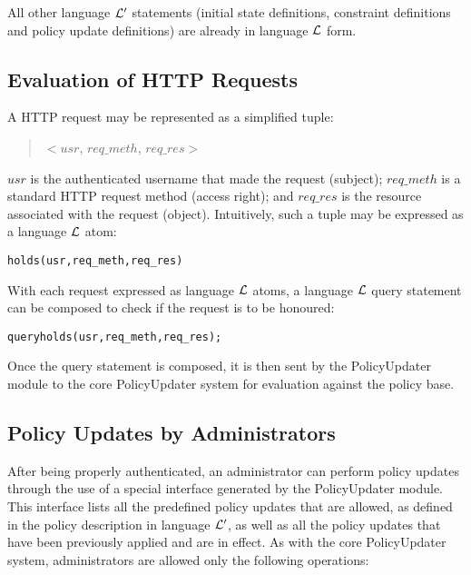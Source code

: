 \documentclass[global,twocolumn,final]{svjour}
\newenvironment{vverbatim}
  {\begin{alltt}}
  {\vspace{-\baselineskip}\end{alltt}}
\begin{document}
      All other language ${\cal L'}$ statements (initial state definitions,
      constraint definitions and policy update definitions) are already in
      language ${\cal L}$ form.

    \subsection{Evaluation of HTTP Requests}

      A HTTP request may be represented as a simplified tuple:

      \begin{quote}
        $<$$usr$, $req\_meth$, $req\_res$$>$
      \end{quote}

      $usr$ is the authenticated username that made the request (subject);
      $req\_meth$ is a standard HTTP request method (access right); and
      $req\_res$ is the resource associated with the request (object).
      Intuitively, such a tuple may be expressed as a language ${\cal L}$ atom:

      \begin{vverbatim}
  holds(usr, req\_meth, req\_res)
      \end{vverbatim}

      With each request expressed as language ${\cal L}$ atoms, a language
      ${\cal L}$ query statement can be composed to check if the request is
      to be honoured:

      \begin{vverbatim}
  query holds(usr, req\_meth, req\_res);
      \end{vverbatim}

      Once the query statement is composed, it is then sent by the
      PolicyUpdater module to the core PolicyUpdater system for evaluation
      against the policy base.

    \subsection{Policy Updates by Administrators}

      After being properly authenticated, an administrator can perform policy
      updates through the use of a special interface generated by the
      PolicyUpdater module. This interface lists all the predefined policy
      updates that are allowed, as defined in the policy description in
      language ${\cal L'}$, as well as all the policy updates that have been
      previously applied and are in effect. As with the core PolicyUpdater
      system, administrators are allowed only the following operations:
\end{document}

